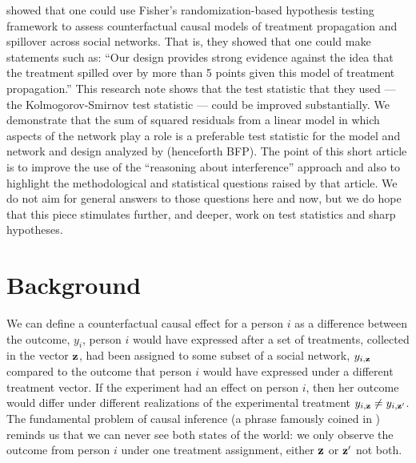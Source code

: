 
\citet{bowers2013sutva} showed that one could use Fisher's
randomization-based hypothesis testing framework to assess counterfactual
causal models of treatment propagation and spillover across social networks.
That is, they showed that one could make
statements such as: ``Our design provides strong evidence against the idea
that the treatment spilled over by more than 5 points given this model of
treatment propagation.'' This research note shows that the test statistic that
they used --- the Kolmogorov-Smirnov test statistic  \citep[\S
5.4]{MylesHollander1999a} --- could be improved substantially. We demonstrate that the sum of squared residuals from a linear
model in which aspects of the network play a role is a preferable test
statistic for the model and network and design analyzed by
\citet{bowers2013sutva} (henceforth BFP). The point of this short article is to improve the
use of the ``reasoning about interference'' approach and also to highlight
the methodological and statistical questions raised by that article. We do
not aim for general answers to those questions here and now, but we do hope
that this piece stimulates further, and  deeper, work on test statistics and
sharp hypotheses.

\section{Background}

We can define a counterfactual causal effect for a person $i$ as a difference
between the outcome, $y_i$, person $i$ would have expressed
after a set of treatments, collected in the vector $\mathbf{z}$, had been assigned to some subset of a social network,
$y_{i,\mathbf{z}}$ compared to the outcome that person $i$ would have expressed
under a different treatment vector. If the experiment had an effect on person
$i$, then her outcome would differ under different realizations of the
experimental treatment $y_{i,\mathbf{z}} \ne y_{i,\mathbf{z}'}$. The fundamental problem of
causal inference (a phrase famously coined in \cite{holland:1986a}) reminds
us that we can never see both states of the world: we only observe the
outcome from person $i$ under one treatment assignment, either $\mathbf{z}$ or
$\mathbf{z}'$ not both.

